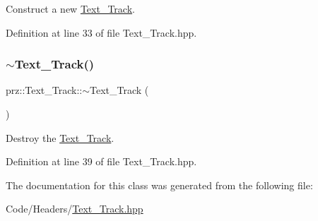 Construct a new \mbox{\hyperlink{classprz_1_1_text___track}{Text\+\_\+\+Track}}. 



Definition at line 33 of file Text\+\_\+\+Track.\+hpp.

\mbox{\label{classprz_1_1_text___track_afc271eaf47473488c65986d56c9bdc51}} 
\subsubsection{\texorpdfstring{$\sim$Text\_Track()}{~Text\_Track()}}
{\footnotesize\ttfamily prz\+::\+Text\+\_\+\+Track\+::$\sim$\+Text\+\_\+\+Track (\begin{DoxyParamCaption}{ }\end{DoxyParamCaption})\hspace{0.3cm}{\ttfamily [inline]}}



Destroy the \mbox{\hyperlink{classprz_1_1_text___track}{Text\+\_\+\+Track}}. 



Definition at line 39 of file Text\+\_\+\+Track.\+hpp.



The documentation for this class was generated from the following file\+:\begin{DoxyCompactItemize}
\item 
Code/\+Headers/\mbox{\hyperlink{_text___track_8hpp}{Text\+\_\+\+Track.\+hpp}}\end{DoxyCompactItemize}
